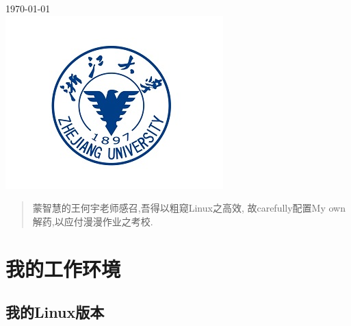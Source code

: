\begin{titlepage}
{\large \today}\\[0.5cm] %


\includegraphics{ZJU.png}\\[1cm] %
 

\vfill %

\end{titlepage}


\begin{abstract}

\vspace{5ex}

蒙智慧的王何宇老师感召,吾得以粗窥Linux之高效,
故carefully配置My own解药,以应付漫漫作业之考校.

\end{abstract}

\section{我的工作环境}

\vspace{5ex}

\subsection{我的Linux版本}

\vspace{2ex}

